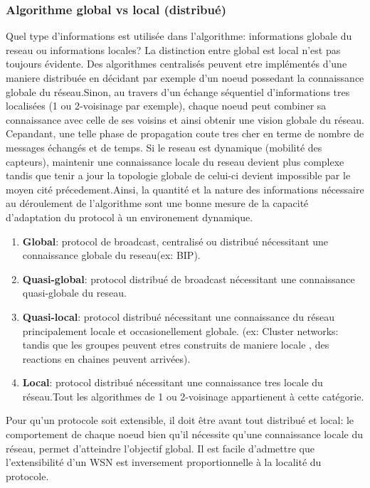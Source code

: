 \subsubsection{Algorithme global vs local (distribué)}
Quel type d'informations est utilisée dans l'algorithme: informations globale du reseau ou informations locales? La distinction entre global est local n'est pas toujours évidente. Des algorithmes centralisés peuvent etre implémentés
 d'une maniere distribuée en décidant par exemple d'un noeud possedant la connaissance globale du réseau.Sinon, au travers d'un échange séquentiel d'informations tres localisées (1 ou 2-voisinage par exemple), chaque noeud peut combiner sa 
connaissance avec celle de ses voisins et ainsi obtenir une vision globale du réseau. Cepandant, une telle phase de propagation coute tres cher en terme de nombre de messages échangés et de temps.
Si le reseau est dynamique (mobilité des capteurs), maintenir une connaissance locale du reseau devient plus complexe tandis que tenir a jour la topologie globale de celui-ci devient impossible par le moyen cité précedement.Ainsi, 
la quantité et la nature des informations nécessaire au déroulement de l'algorithme sont une bonne mesure de la capacité d'adaptation du protocol à un environement dynamique.   

\begin{enumerate}
 \item \textbf{Global}:         protocol de broadcast, centralisé ou distribué nécessitant une connaissance globale du reseau(ex: BIP).
 \item \textbf{Quasi-global}:   protocol distribué de broadcast nécessitant une connaissance quasi-globale du reseau.
 \item \textbf{Quasi-local}:    protocol distribué nécessitant une connaissance du réseau principalement locale et occasionellement globale.
(ex: Cluster networks: tandis que les groupes peuvent etres construits de maniere locale , des reactions en chaines peuvent arrivées).
 \item \textbf{Local}: 		protocol distribué nécessitant une connaissance tres locale du réseau.Tout les algorithmes de 1 ou 2-voisinage appartienent à cette catégorie.
\end{enumerate}

Pour qu'un protocole soit extensible, il doit être avant tout distribué et local: le comportement de chaque noeud bien qu'il nécessite qu'une connaissance locale du réseau, permet d'atteindre l'objectif global. Il est facile d'admettre que l'extensibilité d'un WSN est inversement proportionnelle à la localité du protocole.


